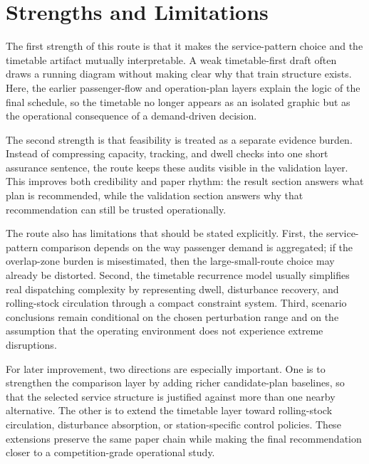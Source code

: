 \section{Strengths and Limitations}

The first strength of this route is that it makes the service-pattern choice and the timetable artifact mutually interpretable. A weak timetable-first draft often draws a running diagram without making clear why that train structure exists. Here, the earlier passenger-flow and operation-plan layers explain the logic of the final schedule, so the timetable no longer appears as an isolated graphic but as the operational consequence of a demand-driven decision.

The second strength is that feasibility is treated as a separate evidence burden. Instead of compressing capacity, tracking, and dwell checks into one short assurance sentence, the route keeps these audits visible in the validation layer. This improves both credibility and paper rhythm: the result section answers what plan is recommended, while the validation section answers why that recommendation can still be trusted operationally.

The route also has limitations that should be stated explicitly. First, the service-pattern comparison depends on the way passenger demand is aggregated; if the overlap-zone burden is misestimated, then the large-small-route choice may already be distorted. Second, the timetable recurrence model usually simplifies real dispatching complexity by representing dwell, disturbance recovery, and rolling-stock circulation through a compact constraint system. Third, scenario conclusions remain conditional on the chosen perturbation range and on the assumption that the operating environment does not experience extreme disruptions.

For later improvement, two directions are especially important. One is to strengthen the comparison layer by adding richer candidate-plan baselines, so that the selected service structure is justified against more than one nearby alternative. The other is to extend the timetable layer toward rolling-stock circulation, disturbance absorption, or station-specific control policies. These extensions preserve the same paper chain while making the final recommendation closer to a competition-grade operational study.

